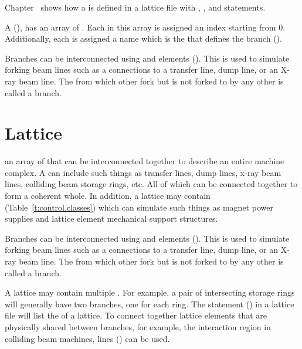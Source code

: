 Chapter~ shows how a  is defined in a lattice file with ,
, and  statements.

A  (), has an array of . Each  in this array
is assigned an index starting from 0. Additionally, each  is assigned a name which is the
 that defines the branch ().

Branches can be interconnected using  and  elements (). This
is used to simulate forking beam lines such as a connections to a transfer line, dump line, or an
X-ray beam line. The  from which other  fork but is not forked to by any
other  is called a  branch.

\section{Lattice}
\label{s:lattice.def}

an array of  that can be interconnected together to describe an entire machine
complex. A  can include such things as transfer lines, dump lines, x-ray beam lines,
colliding beam storage rings, etc. All of which can be connected together to form a coherent whole. In
addition, a lattice may contain  (Table~\ref{t:control.classes}) which can
simulate such things as magnet power supplies and lattice element mechanical support structures.

Branches can be interconnected using  and  elements (). This
is used to simulate forking beam lines such as a connections to a transfer line, dump line, or an
X-ray beam line. The  from which other  fork but is not forked to by any
other  is called a  branch.

A lattice may contain multiple  . For example, a pair of intersecting storage
rings will generally have two  branches, one for each ring. The  statement
() in a lattice file will list the   of a lattice. To connect
together lattice elements that are physically shared between branches, for example, the interaction
region in colliding beam machines,  lines () can be used.

